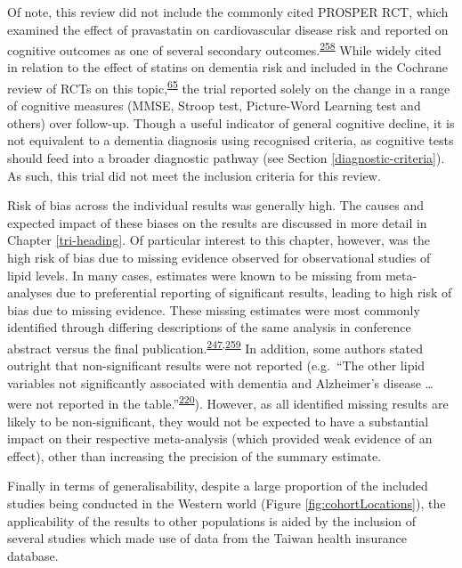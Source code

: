 \documentclass[a4paper, twoside]{templates/ociamthesis}
\begin{document}
Of note, this review did not include the commonly cited PROSPER RCT, which examined the effect of pravastatin on cardiovascular disease risk and reported on cognitive outcomes as one of several secondary outcomes.\textsuperscript{\protect\hyperlink{ref-shepherd2002}{258}} While widely cited in relation to the effect of statins on dementia risk and included in the Cochrane review of RCTs on this topic,\textsuperscript{\protect\hyperlink{ref-mcguinness2016}{65}} the trial reported solely on the change in a range of cognitive measures (MMSE, Stroop test, Picture-Word Learning test and others) over follow-up. Though a useful indicator of general cognitive decline, it is not equivalent to a dementia diagnosis using recognised criteria, as cognitive tests should feed into a broader diagnostic pathway (see Section \ref{diagnostic-criteria}). As such, this trial did not meet the inclusion criteria for this review.

Risk of bias across the individual results was generally high. The causes and expected impact of these biases on the results are discussed in more detail in Chapter \ref{tri-heading}. Of particular interest to this chapter, however, was the high risk of bias due to missing evidence observed for observational studies of lipid levels. In many cases, estimates were known to be missing from meta-analyses due to preferential reporting of significant results, leading to high risk of bias due to missing evidence. These missing estimates were most commonly identified through differing descriptions of the same analysis in conference abstract versus the final publication.\textsuperscript{\protect\hyperlink{ref-yamada2009}{247},\protect\hyperlink{ref-yamada2009conf}{259}} In addition, some authors stated outright that non-significant results were not reported (e.g.~``The other lipid variables not significantly associated with dementia and Alzheimer's disease \ldots{} were not reported in the table.''\textsuperscript{\protect\hyperlink{ref-ancelin2013}{220}}). However, as all identified missing results are likely to be non-significant, they would not be expected to have a substantial impact on their respective meta-analysis (which provided weak evidence of an effect), other than increasing the precision of the summary estimate.

Finally in terms of generalisability, despite a large proportion of the included studies being conducted in the Western world (Figure \ref{fig:cohortLocations}), the applicability of the results to other populations is aided by the inclusion of several studies which made use of data from the Taiwan health insurance database.
\end{document}
